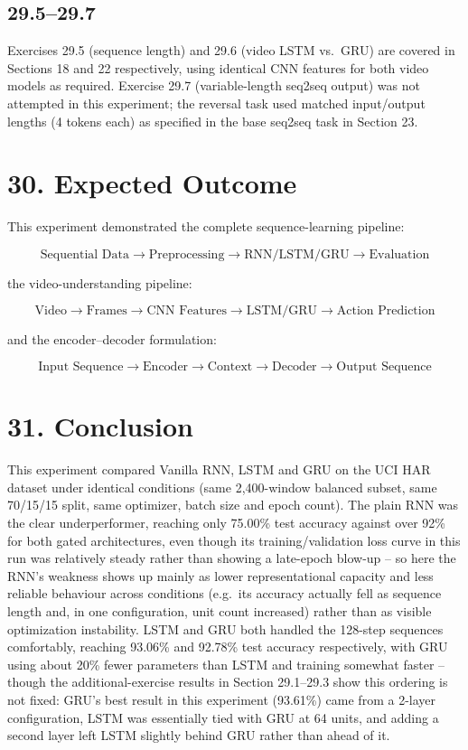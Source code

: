 \documentclass[10pt]{article}
\begin{document}
\subsection*{29.5--29.7}

Exercises 29.5 (sequence length) and 29.6 (video LSTM vs.\ GRU) are covered
in Sections 18 and 22 respectively, using identical CNN features for both
video models as required. Exercise 29.7 (variable-length seq2seq output)
was not attempted in this experiment; the reversal task used matched input/output
lengths (4 tokens each) as specified in the base seq2seq task in Section 23.

\section*{30. Expected Outcome}

This experiment demonstrated the complete sequence-learning pipeline:

\[
\boxed{
\text{Sequential Data}
\rightarrow
\text{Preprocessing}
\rightarrow
\text{RNN/LSTM/GRU}
\rightarrow
\text{Evaluation}
}
\]

the video-understanding pipeline:

\[
\boxed{
\text{Video}
\rightarrow
\text{Frames}
\rightarrow
\text{CNN Features}
\rightarrow
\text{LSTM/GRU}
\rightarrow
\text{Action Prediction}
}
\]

and the encoder--decoder formulation:

\[
\boxed{
\text{Input Sequence}
\rightarrow
\text{Encoder}
\rightarrow
\text{Context}
\rightarrow
\text{Decoder}
\rightarrow
\text{Output Sequence}
}
\]

\section*{31. Conclusion}

This experiment compared Vanilla RNN, LSTM and GRU on the UCI HAR dataset
under identical conditions (same 2,400-window balanced subset, same
70/15/15 split, same optimizer, batch size and epoch count). The plain RNN
was the clear underperformer, reaching only 75.00\% test accuracy against
over 92\% for both gated architectures, even though its training/validation
loss curve in this run was relatively steady rather than showing a
late-epoch blow-up -- so here the RNN's weakness shows up mainly as lower
representational capacity and less reliable behaviour across conditions
(e.g.\ its accuracy actually fell as sequence length and, in one
configuration, unit count increased) rather than as visible optimization
instability. LSTM and GRU both handled the 128-step sequences comfortably,
reaching 93.06\% and 92.78\% test accuracy respectively, with GRU using
about 20\% fewer parameters than LSTM and training somewhat faster --
though the additional-exercise results in Section 29.1--29.3 show this
ordering is not fixed: GRU's best result in this experiment (93.61\%) came
from a 2-layer configuration, LSTM was essentially tied with GRU at 64
units, and adding a second layer left LSTM slightly behind GRU rather than
ahead of it.
\end{document}
